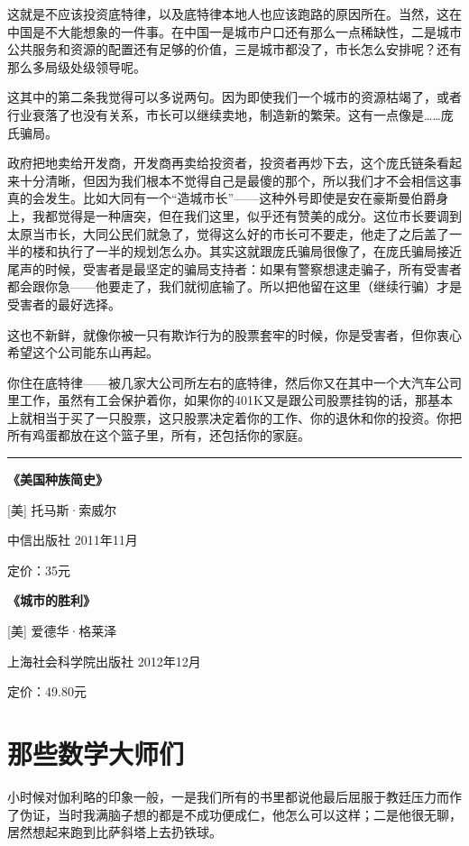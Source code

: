 这就是不应该投资底特律，以及底特律本地人也应该跑路的原因所在。当然，这在中国是不大能想象的一件事。在中国一是城市户口还有那么一点稀缺性，二是城市公共服务和资源的配置还有足够的价值，三是城市都没了，市长怎么安排呢？还有那么多局级处级领导呢。

这其中的第二条我觉得可以多说两句。因为即使我们一个城市的资源枯竭了，或者行业衰落了也没有关系，市长可以继续卖地，制造新的繁荣。这有一点像是\ldots{}\ldots{}庞氏骗局。

政府把地卖给开发商，开发商再卖给投资者，投资者再炒下去，这个庞氏链条看起来十分清晰，但因为我们根本不觉得自己是最傻的那个，所以我们才不会相信这事真的会发生。比如大同有一个``造城市长''------这种外号即使是安在豪斯曼伯爵身上，我都觉得是一种唐突，但在我们这里，似乎还有赞美的成分。这位市长要调到太原当市长，大同公民们就急了，觉得这么好的市长可不要走，他走了之后盖了一半的楼和执行了一半的规划怎么办。其实这就跟庞氏骗局很像了，在庞氏骗局接近尾声的时候，受害者是最坚定的骗局支持者：如果有警察想逮走骗子，所有受害者都会跟你急------他要走了，我们就彻底输了。所以把他留在这里（继续行骗）才是受害者的最好选择。

这也不新鲜，就像你被一只有欺诈行为的股票套牢的时候，你是受害者，但你衷心希望这个公司能东山再起。

你住在底特律------被几家大公司所左右的底特律，然后你又在其中一个大汽车公司里工作，虽然有工会保护着你，如果你的401K又是跟公司股票挂钩的话，那基本上就相当于买了一只股票，这只股票决定着你的工作、你的退休和你的投资。你把所有鸡蛋都放在这个篮子里，所有，还包括你的家庭。

\begin{center}\rule{3in}{0.4pt}\end{center}

\textbf{《美国种族简史》}

{[}美{]} 托马斯·索威尔

中信出版社 2011年11月

定价：35元

\textbf{《城市的胜利》}

{[}美{]} 爱德华·格莱泽

上海社会科学院出版社 2012年12月

定价：49.80元

\section{那些数学大师们}

小时候对伽利略的印象一般，一是我们所有的书里都说他最后屈服于教廷压力而作了伪证，当时我满脑子想的都是不成功便成仁，他怎么可以这样；二是他很无聊，居然想起来跑到比萨斜塔上去扔铁球。

